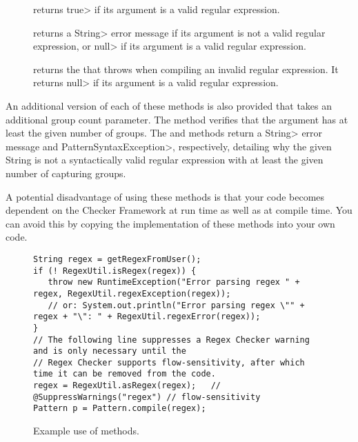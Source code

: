 \begin{description}

\item[]
  returns \<true> if its argument is a valid regular expression.

\item[]
  returns a \<String> error message if its argument is not a valid regular
  expression, or \<null> if its argument is a valid regular expression.

\item[]
  returns the
  that 
  throws when compiling an invalid regular expression.  It returns \<null>
  if its argument is a valid regular expression.

\end{description}

An additional version of each of these methods is also provided that takes
an additional group count parameter. The
 method
verifies that the argument has at least the given number of groups. The
 and
methods return a \<String> error message and \<PatternSyntaxException>,
respectively, detailing why the given String is not a syntactically valid
regular expression with at least the given number of capturing groups.

A potential disadvantage of using these methods is that your code becomes
dependent on the Checker Framework at run time as well as at compile time.
You can avoid this by copying the implementation of these methods into
your own code.

\begin{figure}
\begin{smaller}
\begin{Verbatim}
String regex = getRegexFromUser();
if (! RegexUtil.isRegex(regex)) {
   throw new RuntimeException("Error parsing regex " + regex, RegexUtil.regexException(regex));
   // or: System.out.println("Error parsing regex \"" + regex + "\": " + RegexUtil.regexError(regex));
}
// The following line suppresses a Regex Checker warning and is only necessary until the 
// Regex Checker supports flow-sensitivity, after which time it can be removed from the code.
regex = RegexUtil.asRegex(regex);   // @SuppressWarnings("regex") // flow-sensitivity
Pattern p = Pattern.compile(regex);
\end{Verbatim}
\end{smaller}
\caption{Example use of  methods.}
\label{fig:regex-util-example}
\end{figure}


